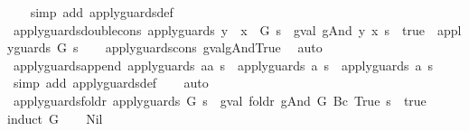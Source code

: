 \begin{isabellebody}
%
\isadelimproof
\ \ %
\endisadelimproof
%
\isatagproof
{}\isamarkupfalse%
\ {\isacharparenleft}simp\ add{\isacharcolon}\ apply{\isacharunderscore}guards{\isacharunderscore}def{\isacharparenright}%
\endisatagproof
{\isafoldproof}%
%
\isadelimproof
\isanewline
%
\endisadelimproof
\isanewline
{}\isamarkupfalse%
\ apply{\isacharunderscore}guards{\isacharunderscore}double{\isacharunderscore}cons{\isacharcolon}\ {\isachardoublequoteopen}apply{\isacharunderscore}guards\ {\isacharparenleft}y\ {\isacharhash}\ x\ {\isacharhash}\ G{\isacharparenright}\ s\ {\isacharequal}\ {\isacharparenleft}gval\ {\isacharparenleft}gAnd\ y\ x{\isacharparenright}\ s\ {\isacharequal}\ true\ {\isasymand}\ apply{\isacharunderscore}guards\ G\ s{\isacharparenright}{\isachardoublequoteclose}\isanewline
%
\isadelimproof
\ \ %
\endisadelimproof
%
\isatagproof
{}\isamarkupfalse%
\ apply{\isacharunderscore}guards{\isacharunderscore}cons\ gval{\isacharunderscore}gAnd{\isacharunderscore}True\ \isamarkupfalse%
\ auto%
\endisatagproof
{\isafoldproof}%
%
\isadelimproof
\isanewline
%
\endisadelimproof
\isanewline
{}\isamarkupfalse%
\ apply{\isacharunderscore}guards{\isacharunderscore}append{\isacharcolon}\ {\isachardoublequoteopen}apply{\isacharunderscore}guards\ {\isacharparenleft}a{\isacharat}a{\isacharprime}{\isacharparenright}\ s\ {\isacharequal}\ {\isacharparenleft}apply{\isacharunderscore}guards\ a\ s\ {\isasymand}\ apply{\isacharunderscore}guards\ a{\isacharprime}\ s{\isacharparenright}{\isachardoublequoteclose}\isanewline
%
\isadelimproof
\ \ %
\endisadelimproof
%
\isatagproof
{}\isamarkupfalse%
\ {\isacharparenleft}simp\ add{\isacharcolon}\ apply{\isacharunderscore}guards{\isacharunderscore}def{\isacharparenright}\isanewline
\ \ \isamarkupfalse%
\ auto%
\endisatagproof
{\isafoldproof}%
%
\isadelimproof
\isanewline
%
\endisadelimproof
\isanewline
{}\isamarkupfalse%
\ apply{\isacharunderscore}guards{\isacharunderscore}foldr{\isacharcolon}\ {\isachardoublequoteopen}apply{\isacharunderscore}guards\ G\ s\ {\isacharequal}\ {\isacharparenleft}gval\ {\isacharparenleft}foldr\ gAnd\ G\ {\isacharparenleft}Bc\ True{\isacharparenright}{\isacharparenright}\ s\ {\isacharequal}\ true{\isacharparenright}{\isachardoublequoteclose}\isanewline
%
\isadelimproof
%
\endisadelimproof
%
\isatagproof
{}\isamarkupfalse%
{\isacharparenleft}induct\ G{\isacharparenright}\isanewline
\ \ \isamarkupfalse%
\ Nil\isanewline
\ \ \isamarkupfalse%
\ \isamarkupfalse%

\end{isabellebody}
